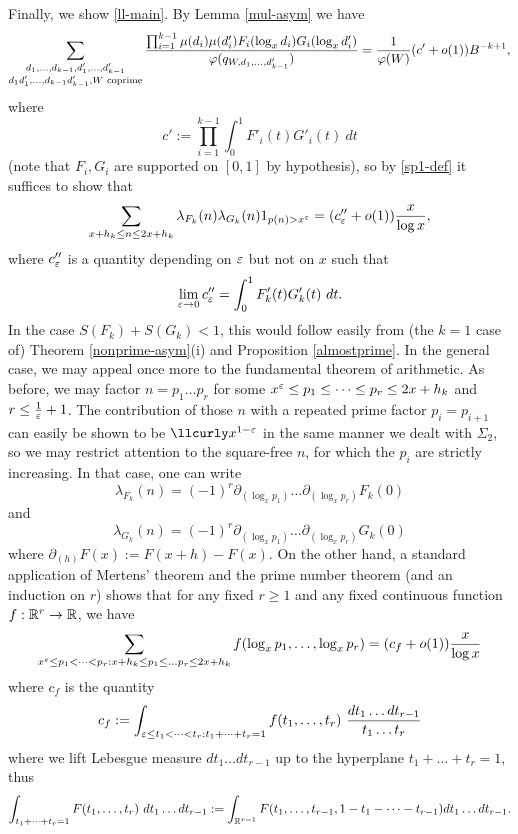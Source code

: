 Finally, we show \eqref{ll-main}.  By Lemma \ref{mul-asym} we have
$$
 \sum_{\substack{ d_1,\dots,d_{k-1},d'_1,\dots,d'_{k-1}\\ d_1d'_1,\dots,d_{k-1}d'_{k-1}, W \text{ coprime}}} \hspace{0pt minus 1fil}\frac{\prod_{i=1}^{k-1} \mu(d_{i}) \mu(d'_{i}) F_{i}(\log_x d_{i}) G_{i}(\log_x d'_{i}) }{\phi(q_{W,d_1,\dots,d'_{k-1}})} = \frac{1}{\phi(W)} (c'+o(1)) B^{-k+1},$$
where
$$ c' := \prod_{i=1}^{k-1} \int_0^1 F'_i(t) G'_i(t)\ dt$$
(note that $F_i, G_i$ are supported on $[0,1]$ by hypothesis), so by \eqref{sp1-def} it suffices to show that
\begin{equation}\label{cpeps}
\sum_{x+h_k \leq n \leq 2x+h_k} \lambda_{F_k}(n) \lambda_{G_k}(n) 1_{p(n)>x^\eps} = (c''_\eps + o(1)) \frac{x}{\log x},
\end{equation}
where $c''_{\eps}$ is a quantity depending on $\eps$ but not on $x$ such that
$$ \lim_{\eps \to 0} c''_{\eps} = \int_0^1 F'_k(t) G'_k(t)\ dt.$$
In the case $S(F_k)+S(G_k) < 1$, this would follow easily from (the $k=1$ case of) Theorem \ref{nonprime-asym}(i) and Proposition \ref{almostprime}.  In the general case, we may appeal once more to the fundamental theorem of arithmetic.  As before, we may factor $n = p_1 \dots p_r$ for some $x^\eps \leq p_1 \leq \dots \leq p_r \leq 2x+h_k$ and $r \leq \frac{1}{\eps}+1$.  The contribution of those $n$ with a repeated prime factor $p_i = p_{i+1}$ can easily be shown to be $\lessapprox x^{1-\eps}$ in the same manner we dealt with $\Sigma_2$, so we may restrict attention to the square-free $n$, for which the $p_i$ are strictly increasing.  In that case, one can write
$$ \lambda_{F_k}(n) = (-1)^r \partial_{(\log_x p_1)} \dots \partial_{(\log_x p_r)} F_k(0)$$
and
$$ \lambda_{G_k}(n) = (-1)^r \partial_{(\log_x p_1)} \dots \partial_{(\log_x p_r)} G_k(0)$$
where $\partial_{(h)} F(x) := F(x+h)-F(x)$.  On the other hand, a standard application of Mertens' theorem and the prime number theorem (and an induction on $r$) shows that for any fixed $r \geq 1$ and any fixed continuous function $f: \R^r \to \R$, we have
$$ \sum_{x^\eps \leq p_1 < \dots < p_r: x+h_k \leq p_1 \leq \dots p_r \leq 2x+h_k} f(\log_x p_1,\dots, \log_x p_r) = (c_f + o(1)) \frac{x}{\log x} $$
where $c_f$ is the quantity
$$ c_f := \int_{\eps \leq t_1 < \dots < t_r: t_1 + \dots + t_r = 1} f( t_1,\dots,t_r)\ \frac{dt_1 \dots dt_{r-1}}{t_1 \dots t_r}$$
where we lift Lebesgue measure $dt_1 \dots dt_{r-1}$ up to the hyperplane $t_1+\dots+t_r=1$, thus
$$ \int_{t_1+\dots+t_r=1} F(t_1,\dots,t_r)\ dt_1 \dots dt_{r-1} := \int_{\R^{r-1}} F(t_1,\dots,t_{r-1},1-t_1-\dots-t_{r-1}) dt_1 \dots dt_{r-1}.$$
